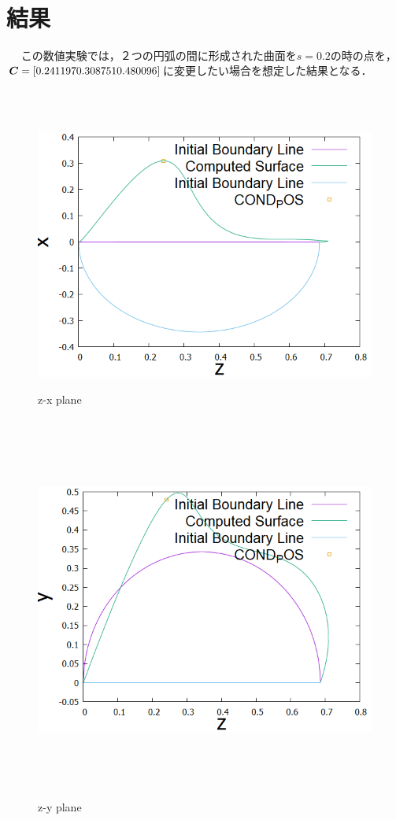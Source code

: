 \documentclass[16.7pt]{jsarticle}
\begin{document}
　   \section{結果}
　   この数値実験では，２つの円弧の間に形成された曲面を$ s=0.2 $の時の点を，$\boldsymbol{C} = [ 0.241197 0.308751 0.480096 ]$に変更したい場合を想定した結果となる．
　   	\begin{figure}[H]
　   		\begin{minipage}{0.5\hsize}
　   			\centering
　   			\includegraphics[width = 1.0\columnwidth]{figure/0409/ObtainedRidgeLinefromz-x.png}
　   			\caption{z-x plane }
　   		\end{minipage}
	　   	\begin{minipage}{0.5\hsize}
	　   		\centering
	　   		\includegraphics[width = 1.0\columnwidth]{figure/0409/ObtainedRidgeLinefromz-y.png}
	　   		\caption{z-y plane }
	　   	\end{minipage}
　   	\end{figure}
\end{document}
